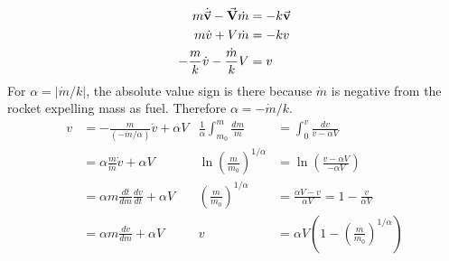 \documentclass[]{article}
\begin{document}
	\begin{equation}
		\begin{split}
			m\dot{\va{v}} - \va{V}\dot{m} &= -k \va{v} \\
			m\dot{v} + V\dot{m} &= -kv \\
			-\frac{m}{k} \dot{v} - \frac{\dot{m}}{k} V &= v \\ 
		\end{split}
	\end{equation}
	For  $\alpha = \left| \dot{m}/k \right| $, the absolute value sign is there because $\dot{m}$ is negative from the rocket expelling mass as fuel. Therefore $\alpha = -\dot{m}/k $.
	\begin{equation}
		\begin{aligned}
			v &= -\frac{m}{(-\dot{m}/\alpha)} \dot{v} + \alpha V & \frac{1}{\alpha} \int_{m_0}^{m} \frac{dm}{m} &= \int_{0}^{v} \frac{dv}{v - \alpha V} \\
			&= \alpha \frac{m}{\dot{m}} \dot{v} + \alpha V & \ln \left( \frac{m}{m_0} \right)^{1/\alpha} &= \ln \left( \frac{v - \alpha V}{-\alpha V} \right) \\
			&= \alpha m \frac{dt}{dm} \frac{dv}{dt} + \alpha V & \left( \frac{m}{m_0} \right)^{1/\alpha} &= \frac{\alpha V - v}{\alpha V} = 1 - \frac{v}{\alpha V} \\
			&= \alpha m \frac{dv}{dm} + \alpha V & v &= \alpha V \left( 1 - \left( \frac{m}{m_0} \right)^{1/\alpha} \right) \\
		\end{aligned}
	\end{equation}
\end{document}
